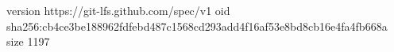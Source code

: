 version https://git-lfs.github.com/spec/v1
oid sha256:cb4ce3be188962fdfebd487c1568cd293add4f16af53e8bd8cb16e4fa4fb668a
size 1197
